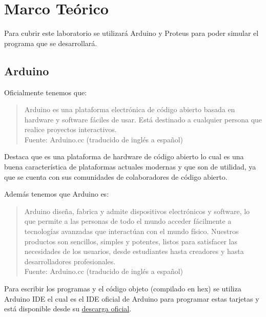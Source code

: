 \documentclass{article}
\begin{document}
    \section{Marco Teórico}

    Para cubrir este laboratorio se utilizará Arduino y Proteus para poder
    simular el programa que se desarrollará.

    \subsection{Arduino}

    Oficialmente tenemos que:

    \begin{quote}
        Arduino es una plataforma electrónica de código abierto basada en
        hardware y software fáciles de usar. Está destinado a cualquier
        persona que realice proyectos interactivos.\\ \footnotesize
        Fuente: Arduino.cc (traducido de inglés a español) \cite{arduino-2022}
    \end{quote}

    Destaca que es una plataforma de hardware de código abierto lo cual es
    una buena característica de plataformas actuales modernas y que son de
    utilidad, ya que se cuenta con sus comunidades de colaboradores de código
    abierto.

    Además tenemos que Arduino es:

    \begin{quote}
        Arduino diseña, fabrica y admite dispositivos electrónicos y
        software, lo que permite a las personas de todo el mundo acceder
        fácilmente a tecnologías avanzadas que interactúan con el mundo
        físico. Nuestros productos son sencillos, simples y potentes, listos
        para satisfacer las necesidades de los usuarios, desde estudiantes
        hasta creadores y hasta desarrolladores profesionales. \\ \footnotesize
        Fuente: Arduino.cc (traducido de inglés a español) \cite{arduino-2022}
    \end{quote}

    Para escribir los programas y el código objeto (compilado en hex) se
    utiliza Arduino IDE el cual es el IDE oficial de Arduino para programar
    estas tarjetas y está disponible desde su \href{https://docs.arduino.cc/software/ide-v2/tutorials/getting-started/ide-v2-downloading-and-installing}{descarga oficial}.
\end{document}
